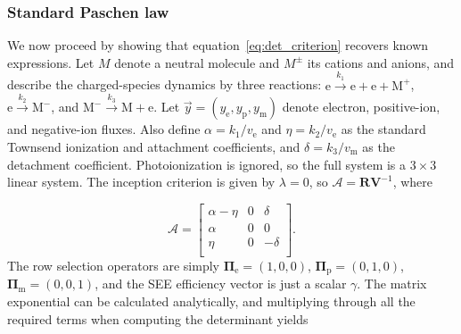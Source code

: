 \documentclass{iopjournal}
\newcommand{\e}{\ensuremath{\text{e}}}
\newcommand{\p}{\ensuremath{\text{p}}}
\newcommand{\m}{\ensuremath{\text{m}}}
\newcommand{\M}{\ensuremath{\text{M}}}
\providecommand\Pie{\ensuremath{\bm{\Pi}_\e}}
\providecommand\Pip{\ensuremath{\bm{\Pi}_\p}}
\providecommand\Pim{\ensuremath{\bm{\Pi}_\m}}
\begin{document}


\subsubsection{Standard Paschen law}
We now proceed by showing that equation~\eqref{eq:det_criterion} recovers known expressions.
Let $M$ denote a neutral molecule and $M^\pm$ its cations and anions, and describe the charged-species dynamics by three reactions: $\e \xrightarrow{k_1} \e + \e + \M^+$, $\e \xrightarrow{k_2}\M^-$, and $\M^-\xrightarrow{k_3} \M + \e$.
Let $\vec{y} = (y_\e, y_\p, y_\m)$ denote electron, positive-ion, and negative-ion fluxes.
Also define $\alpha = k_1/v_\e$ and $\eta = k_2/v_\e$ as the standard Townsend ionization and attachment coefficients, and $\delta = k_3/v_\m$ as the detachment coefficient.
Photoionization is ignored, so the full system is a $3\times3$ linear system.
The inception criterion is given by $\lambda=0$, so $\bm{\mathcal{A}} = \bm{R}\bm{V}^{-1}$, where

\begin{equation}
  \label{eq:A_3x3}
  \bm{\mathcal{A}}
  =
  \begin{bmatrix}
    \alpha - \eta & 0 & \delta \\
    \alpha & 0 & 0 \\
    \eta & 0 & -\delta \\
  \end{bmatrix}.
\end{equation}
The row selection operators are simply $\Pie = (1, 0, 0)$, $\Pip = (0, 1, 0)$, $\Pim = (0,0,1)$, and the SEE efficiency vector is just a scalar $\gamma$.
The matrix exponential can be calculated analytically, and multiplying through all the required terms when computing the determinant yields
\end{document}
